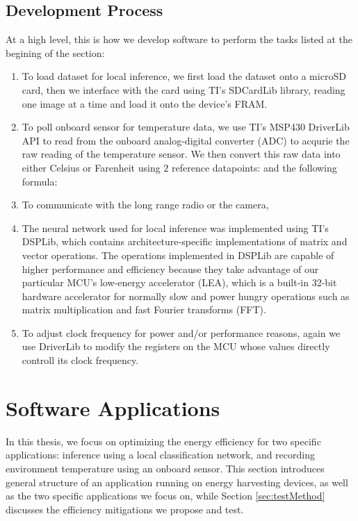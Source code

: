 \documentclass[twoside]{report}
\begin{document}
\subsection{Development Process}
At a high level, this is how we develop software to perform the tasks listed at the begining of the section:
\begin{enumerate}
    \item To load dataset for local inference, we first load the dataset onto a microSD card, 
    then we interface with the card using TI's SDCardLib library, reading one image at a time and load 
    it onto the device's FRAM.

    \item To poll onboard sensor for temperature data, we use TI's MSP430 DriverLib API to read from 
    the onboard analog-digital converter (ADC) to acqurie the raw reading of the temperature sensor. 
    We then convert this raw data into either Celsius or Farenheit using $2$ reference datapoints: 
    and the following formula: 

    \item To communicate with the long range radio or the camera,
    
    \item The neural network used for local inference was implemented using TI's DSPLib, which contains 
    architecture-specific implementations of matrix and vector operations. The operations implemented 
    in DSPLib are capable of higher performance and efficiency because they take advantage of our particular MCU's low-energy accelerator (LEA), 
    which is a built-in 32-bit hardware accelerator for normally slow and power hungry operations such as 
    matrix multiplication and fast Fourier transforms (FFT). 
    
    \item To adjust clock frequency for power and/or performance reasons, again we use DriverLib 
    to modify the registers on the MCU whose values directly controll its clock frequency.
\end{enumerate}

\section{Software Applications}
In this thesis, we focus on optimizing the energy efficiency for two specific applications: 
inference using a local classification network, and recording environment temperature using an 
onboard sensor. This section introduces general structure of an application running on energy harvesting devices, 
as well as the two specific applications we focus on, while Section \ref{sec:testMethod} 
discusses the efficiency mitigations we propose and test.
\end{document}
